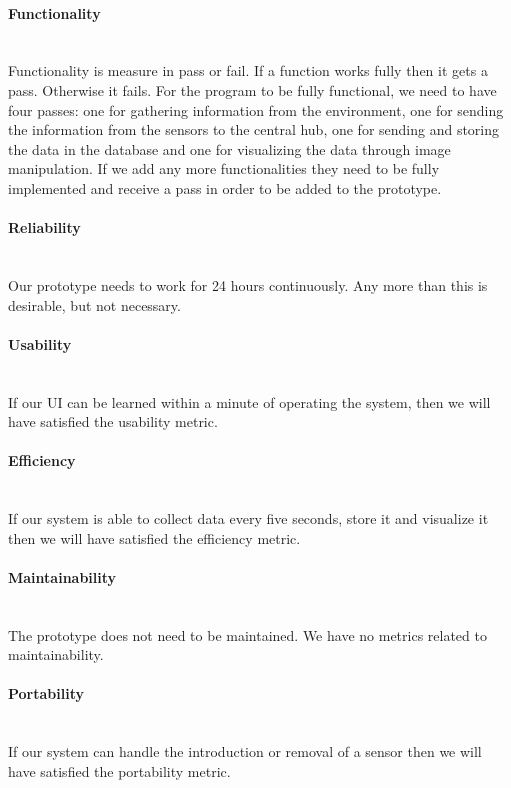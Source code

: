 \documentclass[../document.tex]{subfiles}
\begin{document}
\paragraph{Functionality} \ \\
Functionality is measure in pass or fail. If a function works fully then it gets a pass. Otherwise it fails. For the program to be fully functional, we need to have four passes: one for gathering information from the environment, one for sending the information from the sensors to the central hub, one for sending and storing the data in the database and one for visualizing the data through image manipulation. If we add any more functionalities they need to be fully implemented and receive a pass in order to be added to the prototype.

\paragraph{Reliability} \ \\
Our prototype needs to work for 24 hours continuously. Any more than this is desirable, but not necessary.

\paragraph{Usability} \ \\
If our UI can be learned within a minute of operating the system, then we will have satisfied the usability metric.

\paragraph{Efficiency} \ \\
If our system is able to collect data every five seconds, store it and visualize it then we will have satisfied the efficiency metric.

\paragraph{Maintainability} \ \\
The prototype does not need to be maintained. We have no metrics related to maintainability.

\paragraph{Portability} \ \\
If our system can handle the introduction or removal of a sensor then we will have satisfied the portability metric.
\end{document}
